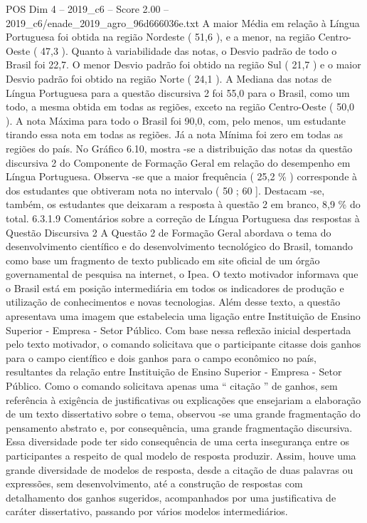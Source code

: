 \begin{textsample}{POS Dim 4 – 2019\_c6 – Score 2.00 – 2019\_c6/enade\_2019\_agro\_96d666036e.txt}
A maior Média em relação à Língua Portuguesa foi obtida na região Nordeste ( 51,6 ), e a menor, na região Centro-Oeste ( 47,3 ).
Quanto à variabilidade das notas, o Desvio padrão de todo o Brasil foi 22,7.
O menor Desvio padrão foi obtido na região Sul ( 21,7 ) e o maior Desvio padrão foi obtido na região Norte ( 24,1 ).
A Mediana das notas de Língua Portuguesa para a questão discursiva 2 foi 55,0 para o Brasil, como um todo, a mesma obtida em todas as regiões, exceto na região Centro-Oeste ( 50,0 ).
A nota Máxima para todo o Brasil foi 90,0, com, pelo menos, um estudante tirando essa nota em todas as regiões.
Já a nota Mínima foi zero em todas as regiões do país.
No Gráfico 6.10, mostra -se a distribuição das notas da questão discursiva 2 do Componente de Formação Geral em relação do desempenho em Língua Portuguesa.
Observa -se que a maior frequência ( 25,2 \% ) corresponde à dos estudantes que obtiveram nota no intervalo ( 50 ; 60 ].
Destacam -se, também, os estudantes que deixaram a resposta à questão 2 em branco, 8,9 \% do total. 6.3.1.9 Comentários sobre a correção de Língua Portuguesa das respostas à Questão Discursiva 2 A Questão 2 de Formação Geral abordava o tema do desenvolvimento científico e do desenvolvimento tecnológico do Brasil, tomando como base um fragmento de texto publicado em site oficial de um órgão governamental de pesquisa na internet, o Ipea.
O texto motivador informava que o Brasil está em posição intermediária em todos os indicadores de produção e utilização de conhecimentos e novas tecnologias.
Além desse texto, a questão apresentava uma imagem que estabelecia uma ligação entre Instituição de Ensino Superior - Empresa - Setor Público.
Com base nessa reflexão inicial despertada pelo texto motivador, o comando solicitava que o participante citasse dois ganhos para o campo científico e dois ganhos para o campo econômico no país, resultantes da relação entre Instituição de Ensino Superior - Empresa - Setor Público.
Como o comando solicitava apenas uma “ citação ” de ganhos, sem referência à exigência de justificativas ou explicações que ensejariam a elaboração de um texto dissertativo sobre o tema, observou -se uma grande fragmentação do pensamento abstrato e, por consequência, uma grande fragmentação discursiva.
Essa diversidade pode ter sido consequência de uma certa insegurança entre os participantes a respeito de qual modelo de resposta produzir.
Assim, houve uma grande diversidade de modelos de resposta, desde a citação de duas palavras ou expressões, sem desenvolvimento, até a construção de respostas com detalhamento dos ganhos sugeridos, acompanhados por uma justificativa de caráter dissertativo, passando por vários modelos intermediários.

\end{textsample}
